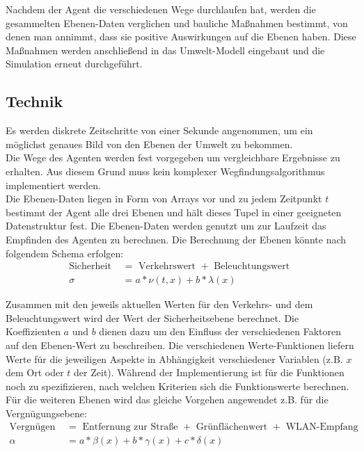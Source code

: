 \documentclass[10pt]{scrartcl}
\begin{document}
Nachdem der Agent die verschiedenen Wege durchlaufen hat, werden die gesammelten Ebenen-Daten verglichen und bauliche Maßnahmen bestimmt, von denen man annimmt, dass sie positive Auswirkungen auf die Ebenen haben. Diese Maßnahmen werden anschließend in das Umwelt-Modell eingebaut und die Simulation erneut durchgeführt.

\subsection{Technik}
Es werden diskrete Zeitschritte von einer Sekunde angenommen, um ein möglichst genaues Bild von den Ebenen der Umwelt zu bekommen.\\
Die Wege des Agenten werden fest vorgegeben um vergleichbare Ergebnisse zu erhalten. Aus diesem Grund muss kein komplexer Wegfindungsalgorithmus implementiert werden.\\
Die Ebenen-Daten liegen in Form von Arrays vor und zu jedem Zeitpunkt $t$ bestimmt der Agent alle drei Ebenen und hält dieses Tupel in einer geeigneten Datenstruktur fest. Die Ebenen-Daten werden genutzt um zur Laufzeit das Empfinden des Agenten zu berechnen.
Die Berechnung der Ebenen könnte nach folgendem Schema erfolgen:
\begin{align}
	\text{Sicherheit } &= \text{ Verkehrswert } + \text{ Beleuchtungswert }\\
	\sigma &= a * \nu(t,x) + b * \lambda(x)
\end{align}

Zusammen mit den jeweils aktuellen Werten für den Verkehrs- und dem Beleuchtungswert wird der Wert der Sicherheitsebene berechnet.
Die Koeffizienten $a$ und $b$ dienen dazu um den Einfluss der verschiedenen Faktoren auf den Ebenen-Wert zu beschreiben.
Die verschiedenen Werte-Funktionen liefern Werte für die jeweiligen Aspekte in Abhängigkeit verschiedener Variablen (z.B. $x$ dem Ort oder $t$ der Zeit).
Während der Implementierung ist für die Funktionen noch zu spezifizieren, nach welchen Kriterien sich die Funktionswerte berechnen.
Für die weiteren Ebenen wird das gleiche Vorgehen angewendet z.B. für die Vergnügungsebene:
\begin{align}
	\text{Vergnügen } &= \text{ Entfernung zur Straße } + \text{ Grünflächenwert } + \text{ WLAN-Empfang}\\
	\alpha &= a * \beta(x) + b * \gamma(x) + c * \delta(x)
\end{align}
\end{document}
